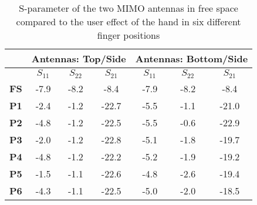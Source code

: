 \begin{table}[]
  \centering
  \begin{tabular}{|c|c|c|c|c|c|c|}
    \hline
    & \multicolumn{3}{c|}{\textbf{Antennas: Top/Side}} & \multicolumn{3}{c|}{\textbf{Antennas: Bottom/Side}} \\ \hline
                & $S_{11}$        & $S_{22}$        & $S_{21}$       & $S_{11}$         & $S_{22}$         & $S_{21}$             \\ \hline
    \textbf{FS} & -7.9           & -8.2           & -8.4           & -7.9            & -8.2            & -8.4            \\ \hline
    \textbf{P1} & -2.4           & -1.2           & -22.7          & -5.5            & -1.1            & -21.0           \\ \hline
    \textbf{P2} & -4.8           & -1.2           & -22.5          & -5.5            & -0.6            & -22.9           \\ \hline
    \textbf{P3} & -2.0           & -1.2           & -22.8          & -5.1            & -1.8            & -19.7           \\ \hline
    \textbf{P4} & -4.8           & -1.2           & -22.2          & -5.2            & -1.9            & -19.2           \\ \hline
    \textbf{P5} & -1.5           & -1.1           & -22.6          & -4.8            & -2.6            & -19.4           \\ \hline
    \textbf{P6} & -4.3           & -1.1           & -22.5          & -5.0            & -2.0            & -18.5           \\ \hline
  \end{tabular}
  \caption{S-parameter of the two MIMO antennas in free space compared to the user effect of the hand in six different finger positions \cite{Samantha2014UserEff}}
  \label{tab:usereff_s11}
\end{table}


